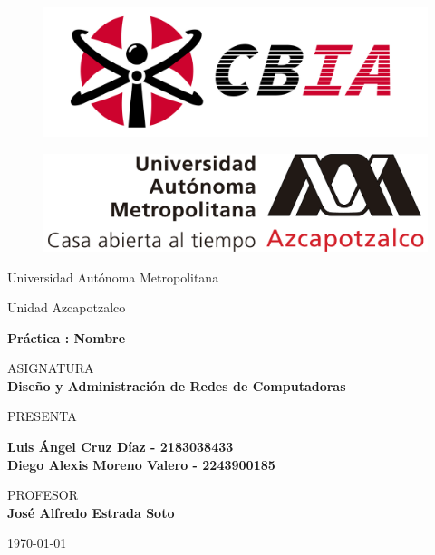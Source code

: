 
\begin{figure}[ht]
    \centering %
    \begin{minipage}{0.45\textwidth} %
        \includegraphics[width=\textwidth]{img/portada/CBI.png}
        \label{CBI}
    \end{minipage}\hfill %
    \begin{minipage}{0.45\textwidth}
        \includegraphics[width=\textwidth]{img/portada/UAM.png}
        \label{UAM}
    \end{minipage}
\end{figure}


\begin{center}
\vspace{0.8cm}
\LARGE
Universidad Autónoma Metropolitana

\vspace{0.8cm}
\LARGE
Unidad Azcapotzalco

\vspace{1.7cm}
\Large
\textbf{Práctica : Nombre}

\vspace{1.3cm}
\normalsize	
ASIGNATURA \\
\vspace{.3cm}
\large
\textbf{Diseño y Administración de Redes de Computadoras}

\vspace{1.3cm}
\normalsize
PRESENTA \\
\vspace{.3cm}
\large

\textbf{Luis Ángel Cruz Díaz - 2183038433\\}
\textbf{Diego Alexis Moreno Valero - 2243900185}

\vspace{1.3cm}
\normalsize	
PROFESOR \\
\vspace{.3cm}
\large
\textbf{José Alfredo Estrada Soto} 

\vspace{1.3cm}
\today
\end{center}

\thispagestyle{empty} 
\newpage